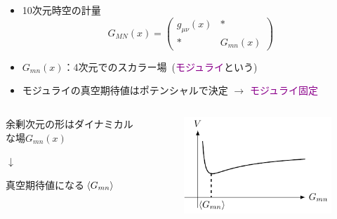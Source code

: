 \documentclass[
  a4paper,uplatex,dvipdfmx,9pt,
  xcolor = {dvipsnames,svgnames},
  hyperref ={colorlinks=true,citecolor=Navy,linkcolor=NavyBlue,urlcolor=purple}
]{beamer}
\begin{document}
\begin{frame}
  \frametitle{\thesection\ \secname}
    
  \begin{itemize}
    \item 
    10次元時空の計量
    \begin{equation}
      G_{MN}(x)
      =
      \begin{pmatrix}
        g_{\mu\nu}(x) & * \\
        * & G_{mn}(x)
      \end{pmatrix}
      \nonumber
    \end{equation}
    \item 
    $G_{mn}(x)$：4次元でのスカラー場\ (\textcolor{DarkMagenta}{モジュライ}という)
    \item 
    モジュライの真空期待値はポテンシャルで決定
    $\longrightarrow$
    \textcolor{DarkMagenta}{モジュライ固定}
  \end{itemize}

  \begin{columns}[t]    
    \begin{column}{0.49\textwidth} 
      \begin{center}
        余剰次元の形はダイナミカルな場$G_{mn}(x)$

        \vspace{5pt}

        $\downarrow$

        \vspace{5pt}

        真空期待値になる$\ev*{G_{mn}}$
      \end{center}
    \end{column}
    \begin{column}{0.4\textwidth}  
      \begin{figure}[ht]
        \centering
        \includegraphics[keepaspectratio,width=0.8\linewidth]{fig/intro_potential/intro_potential.pdf}         
      \end{figure}
    \end{column}
  \end{columns}

\end{frame}
\end{document}
